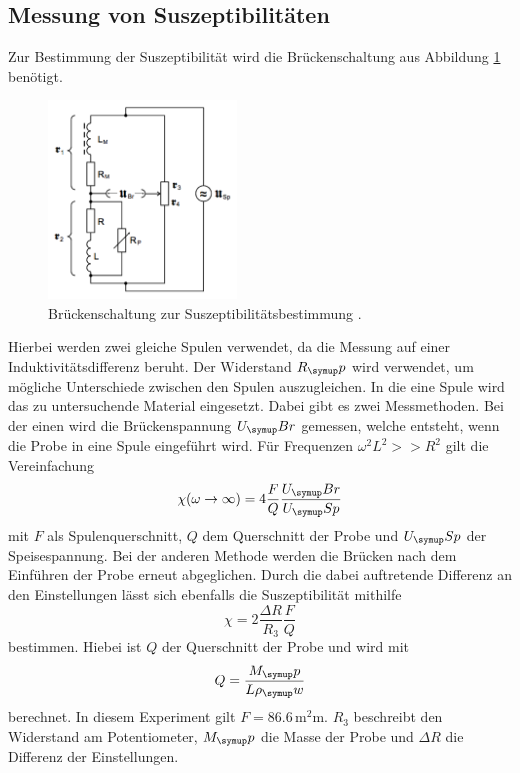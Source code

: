 \subsection{Messung von Suszeptibilitäten}
Zur Bestimmung der Suszeptibilität wird die Brückenschaltung aus Abbildung
\ref{fig:schaltung} benötigt.
\begin{figure}
  \centering
  \includegraphics[width=5cm]{bilder/schaltung.png}
  \caption{Brückenschaltung zur Suszeptibilitätsbestimmung \cite{606}.}
  \label{fig:schaltung}
\end{figure}
Hierbei werden zwei gleiche Spulen verwendet, da die Messung auf einer
Induktivitätsdifferenz beruht. Der Widerstand $R_\su{p}$ wird verwendet,
um mögliche Unterschiede zwischen den Spulen auszugleichen. In die eine Spule wird das
zu untersuchende
Material eingesetzt. Dabei gibt es zwei Messmethoden. Bei der einen wird die
Brückenspannung $U_\su{Br}$ gemessen, welche entsteht, wenn die Probe in eine
Spule eingeführt wird. Für Frequenzen $\omega^2L^2 >>R^2$ gilt die Vereinfachung
\begin{equation}
 \chi (\omega \to \infty) = 4 \frac{F}{Q}\frac{U_\su{Br}}{U_\su{Sp}}
\end{equation}
mit $F$ als Spulenquerschnitt, $Q$ dem Querschnitt der Probe und $U_\su{Sp}$ der
Speisespannung.
Bei der anderen Methode werden die Brücken nach dem Einführen der Probe erneut
abgeglichen. Durch die dabei auftretende Differenz an den Einstellungen
lässt sich ebenfalls die Suszeptibilität mithilfe
\begin{equation}
 \chi = 2\frac{\Delta R}{R_3}\frac{F}{Q}
 \label{eqn:suszep}
\end{equation}
bestimmen. Hiebei ist $Q$ der Querschnitt der Probe und wird mit
\begin{equation}
  Q=\frac{M_\su{p}}{L\rho_\su{w}}
\end{equation}
berechnet. In diesem Experiment gilt $F = 86.6 \,\si{\square\milli\meter}$.
 $R_3$ beschreibt den Widerstand am Potentiometer, $M_\su{p}$ die Masse der Probe
und $\Delta R$ die Differenz der Einstellungen.

